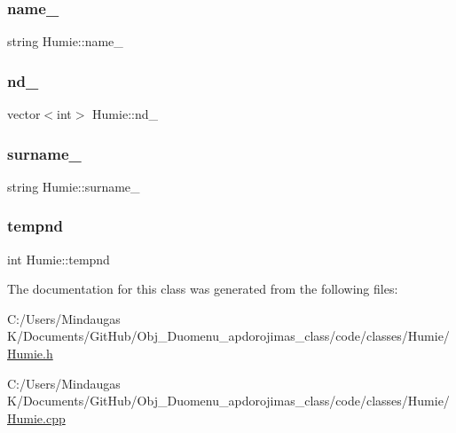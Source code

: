 \subsubsection{\texorpdfstring{name\_}{name\_}}
{\footnotesize\ttfamily string Humie\+::name\+\_\+\hspace{0.3cm}{\ttfamily [protected]}}

\mbox{\label{class_humie_a9fb644c20dd87fedac9a29eac85f1c05}} 
\subsubsection{\texorpdfstring{nd\_}{nd\_}}
{\footnotesize\ttfamily vector$<$int$>$ Humie\+::nd\+\_\+\hspace{0.3cm}{\ttfamily [protected]}}

\mbox{\label{class_humie_a2c9c318aa4e8bb5a0c60f4263291961d}} 
\subsubsection{\texorpdfstring{surname\_}{surname\_}}
{\footnotesize\ttfamily string Humie\+::surname\+\_\+\hspace{0.3cm}{\ttfamily [protected]}}

\mbox{\label{class_humie_a5c8fe9c666790c1d3ea65a96a90cfa31}} 
\subsubsection{\texorpdfstring{tempnd}{tempnd}}
{\footnotesize\ttfamily int Humie\+::tempnd\hspace{0.3cm}{\ttfamily [protected]}}



The documentation for this class was generated from the following files\+:\begin{DoxyCompactItemize}
\item 
C\+:/\+Users/\+Mindaugas K/\+Documents/\+Git\+Hub/\+Obj\+\_\+\+Duomenu\+\_\+apdorojimas\+\_\+class/code/classes/\+Humie/\mbox{\hyperlink{code_2classes_2_humie_2_humie_8h}{Humie.\+h}}\item 
C\+:/\+Users/\+Mindaugas K/\+Documents/\+Git\+Hub/\+Obj\+\_\+\+Duomenu\+\_\+apdorojimas\+\_\+class/code/classes/\+Humie/\mbox{\hyperlink{code_2classes_2_humie_2_humie_8cpp}{Humie.\+cpp}}\end{DoxyCompactItemize}
